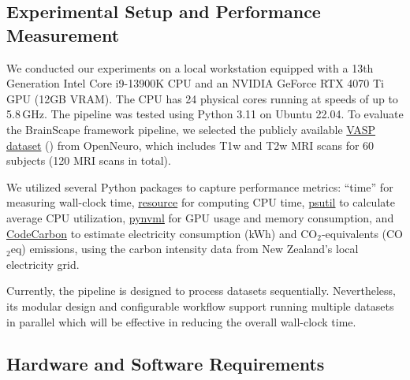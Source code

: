 \subsection{Experimental Setup and Performance Measurement}

We conducted our experiments on a local workstation equipped with a 13th Generation Intel Core i9-13900K CPU 
and an NVIDIA GeForce RTX 4070 Ti GPU (12GB VRAM). 
The CPU has 24 physical cores running at speeds of up to 5.8\,GHz. 
The pipeline was tested using Python 3.11 on Ubuntu 22.04.
To evaluate the BrainScape framework pipeline, 
we selected the publicly available \href{https://openneuro.org/datasets/ds003717}{VASP dataset} (\cite{peelle2022increased}) from OpenNeuro, 
which includes T1w and T2w MRI scans for 60 subjects (120 MRI scans in total). 

We utilized several Python packages to capture performance metrics: 
``time'' for measuring wall-clock time, 
\href{https://docs.python.org/3/library/resource.html}{resource} for computing CPU time,
\href{https://pypi.org/project/psutil/}{psutil} to calculate average CPU utilization, 
\href{https://pypi.org/project/pynvml/}{pynvml} for GPU usage and memory consumption, and 
\href{https://pypi.org/project/codecarbon/}{CodeCarbon} to estimate electricity consumption (kWh) and CO$_2$-equivalents (CO$_2$eq) emissions, 
using the carbon intensity data from New Zealand's local electricity grid.

Currently, the pipeline is designed to process datasets sequentially. 
Nevertheless, its modular design and configurable workflow support running multiple datasets in parallel 
which will be effective in reducing the overall wall-clock time.


\subsection{Hardware and Software Requirements}

